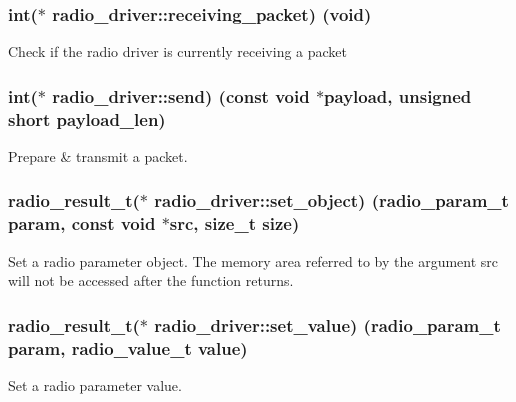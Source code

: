 \subsubsection[{receiving\+\_\+packet}]{\setlength{\rightskip}{0pt plus 5cm}int($\ast$  radio\+\_\+driver\+::receiving\+\_\+packet) (void)}\label{structradio__driver_a69caf76a3322491ff93e1d36ec0b5480}
Check if the radio driver is currently receiving a packet \hypertarget{structradio__driver_a30e7b635e51b106d36b8aae3a3ffd4d9}{}
\subsubsection[{send}]{\setlength{\rightskip}{0pt plus 5cm}int($\ast$  radio\+\_\+driver\+::send) (const void $\ast$payload, unsigned short payload\+\_\+len)}\label{structradio__driver_a30e7b635e51b106d36b8aae3a3ffd4d9}
Prepare \& transmit a packet. \hypertarget{structradio__driver_a03992b1e627d7be6bd9cfaf98ee8c8f9}{}
\subsubsection[{set\+\_\+object}]{\setlength{\rightskip}{0pt plus 5cm}radio\+\_\+result\+\_\+t($\ast$  radio\+\_\+driver\+::set\+\_\+object) (radio\+\_\+param\+\_\+t param, const void $\ast$src, size\+\_\+t size)}\label{structradio__driver_a03992b1e627d7be6bd9cfaf98ee8c8f9}
Set a radio parameter object. The memory area referred to by the argument \textquotesingle{}src\textquotesingle{} will not be accessed after the function returns. \hypertarget{structradio__driver_af809fe7735fa3951f22c8ab54c1c4917}{}
\subsubsection[{set\+\_\+value}]{\setlength{\rightskip}{0pt plus 5cm}radio\+\_\+result\+\_\+t($\ast$  radio\+\_\+driver\+::set\+\_\+value) (radio\+\_\+param\+\_\+t param, {\bf radio\+\_\+value\+\_\+t} value)}\label{structradio__driver_af809fe7735fa3951f22c8ab54c1c4917}
Set a radio parameter value. \hypertarget{structradio__driver_a5e0e87a4384c32182b9047f4f65d24e1}{}
